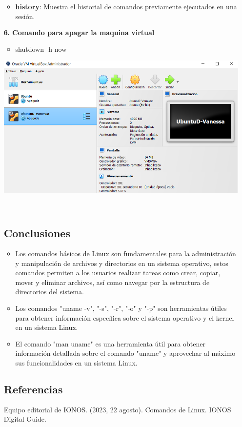 \documentclass[11pt,twoside]{book}
\begin{document}
\begin{enumerate}
\begin{itemize}
    \item \textbf{history}: Muestra el historial de comandos previamente ejecutados en una sesión.
      
      
      
  \end{itemize}
  \item[\textbf{6.}] \textbf{Comando para apagar la maquina virtual} 
  \begin{itemize}
      \item shutdown -h now
  \end{itemize}
      \begin{minipage}{\linewidth}
        \centering
        \includegraphics[width=0.5\linewidth]{comandoapagar.png}
        \label{fig:etiqueta}
    \end{minipage}\\

  

\subsection*{Conclusiones}
\begin{itemize}
  \item Los comandos básicos de Linux son fundamentales para la administración y manipulación de archivos y directorios en un sistema operativo, estos comandos permiten a los usuarios realizar tareas como crear, copiar, mover y eliminar archivos, así como navegar por la estructura de directorios del sistema.
  \item Los comandos "uname -v", "-s", "-r", "-o" y "-p" son herramientas útiles para obtener información específica sobre el sistema operativo y el kernel en un sistema Linux.
  \item El comando "man uname" es una herramienta útil para obtener información detallada sobre el comando "uname" y aprovechar al máximo sus funcionalidades en un sistema Linux.
\end{itemize}

\subsection*{Referencias}
Equipo editorial de IONOS. (2023, 22 agosto). Comandos de Linux. IONOS Digital Guide. 

\end{enumerate}
\newpage
\end{document}
